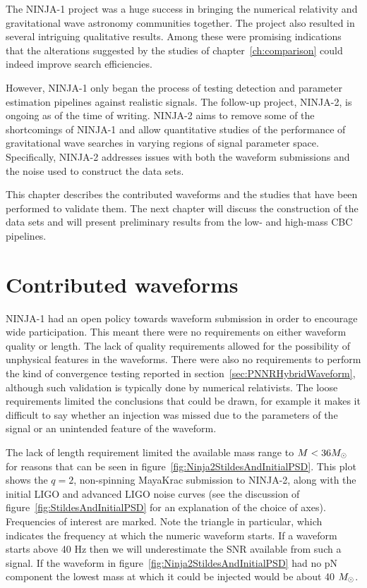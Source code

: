 The NINJA-1 project was a huge success in bringing the numerical
relativity and gravitational wave astronomy communities together.  The
project also resulted in several intriguing qualitative results.
Among these were promising indications that the alterations suggested 
by the studies of chapter~\ref{ch:comparison} could indeed improve
search efficiencies.

However, NINJA-1 only began the process of testing detection and
parameter estimation pipelines against realistic signals.  The
follow-up project, NINJA-2, is ongoing as of the time of writing.
NINJA-2 aims to remove some of the shortcomings of NINJA-1 and allow
quantitative studies of the performance of gravitational wave searches
in varying regions of signal parameter space.  Specifically, NINJA-2
addresses issues with both the waveform submissions and the noise used
to construct the data sets.

This chapter describes the contributed waveforms and the studies that
have been performed to validate them.  The next chapter will discuss
the construction of the data sets and will present preliminary results
from the low- and high-mass CBC pipelines.

\section{Contributed waveforms}

NINJA-1 had an open policy towards waveform submission in order to
encourage wide participation.  This meant there were no requirements
on either waveform quality or length.  The lack of quality
requirements allowed for the possibility of unphysical features in the
waveforms.  There were also no requirements to perform the kind of
convergence testing reported in section~\ref{sec:PNNRHybridWaveform},
although such validation is typically done by numerical
relativists.  The loose requirements limited the conclusions that
could be drawn, for example it makes it difficult to say whether an
injection was missed due to the parameters of the signal or an
unintended feature of the waveform.

The lack of length requirement limited the available mass range to $M
< 36 M_\odot$ for reasons that can be seen in
figure~\ref{fig:Ninja2StildesAndInitialPSD}.  This plot shows the
$q=2$, non-spinning MayaKrac submission to NINJA-2, along with the
initial LIGO and advanced LIGO noise curves (see the discussion of
figure~\ref{fig:StildesAndInitialPSD} for an explanation of the choice
of axes).  Frequencies of interest are marked.  Note the triangle in
particular, which indicates the frequency at which the numeric
waveform starts.  If a waveform starts above 40 Hz then we will
underestimate the SNR available from such a signal.  If the
waveform in figure~\ref{fig:Ninja2StildesAndInitialPSD} had no 
pN component the lowest mass at which it could be injected would be
about 40 $M_\odot$.


